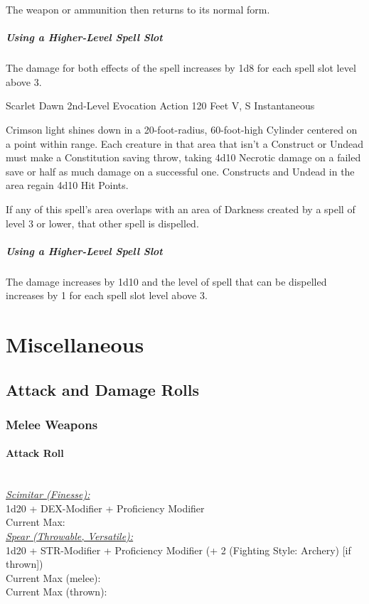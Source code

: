 \documentclass[letterpaper,openany,oneside,twocolumn]{book}
\begin{document}
The weapon or ammunition then returns to its normal form.

\subparagraph*{Using a Higher-Level Spell Slot} The damage for both effects of the spell increases by 1d8 for each spell slot level above 3.

\DndSpellHeader
  {Scarlet Dawn}
  {2nd-Level Evocation}
  {Action}
  {120 Feet}
  {V, S}
  {Instantaneous}

Crimson light shines down in a 20-foot-radius, 60-foot-high Cylinder centered on a point within range. Each creature in that area that isn't a Construct or Undead must make a Constitution saving throw, taking 4d10 Necrotic damage on a failed save or half as much damage on a successful one. Constructs and Undead in the area regain 4d10 Hit Points.

If any of this spell's area overlaps with an area of Darkness created by a spell of level 3 or lower, that other spell is dispelled.

\subparagraph*{Using a Higher-Level Spell Slot} The damage increases by 1d10 and the level of spell that can be dispelled increases by 1 for each spell slot level above 3.

\vfill\eject
\section*{Miscellaneous}
\subsection*{Attack and Damage Rolls}
\subsubsection*{Melee Weapons}
\paragraph*{Attack Roll}\hfill\\
\underline{\textit{Scimitar (Finesse):}}\\
1d20 + DEX-Modifier + Proficiency Modifier\\
\indent Current Max: 
\\
\underline{\textit{Spear (Throwable, Versatile):}}\\
1d20 + STR-Modifier + Proficiency Modifier (+ 2 (Fighting Style: Archery) [if thrown])\\
\indent Current Max (melee): \\
\indent Current Max (thrown): 
\end{document}
